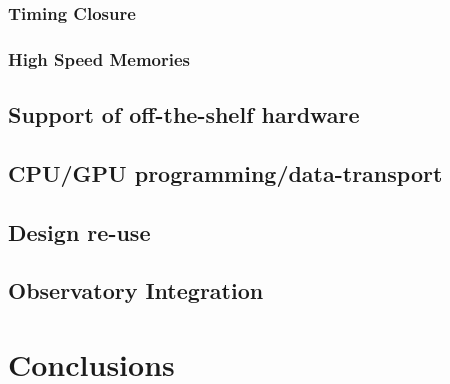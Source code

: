 \documentclass{ws-jai}
\begin{document}
\subsubsection{Timing Closure}

\subsubsection{High Speed Memories} \label{sec: HSM}


\subsection{Support of off-the-shelf hardware}

\subsection{CPU/GPU programming/data-transport}

\subsection{Design re-use}

\subsection{Observatory Integration}


\section{Conclusions} \label{sec:Conclusions}





\end{document}
